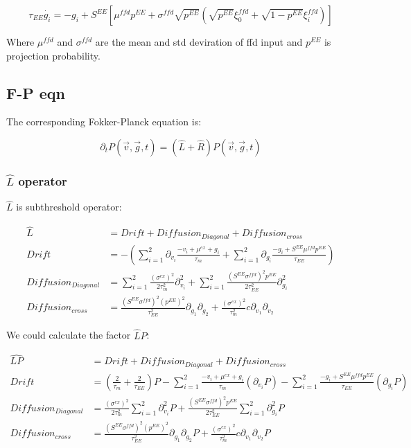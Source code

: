 \documentclass{article}
\begin{document}
\begin{equation}
	\tau_{EE}\dot{g_{i}}=-g_i+S^{EE}[\mu^{ffd}p^{EE}+\sigma^{ffd}\sqrt{p^{EE}}(\sqrt{p^{EE}}\xi^{ffd}_0+\sqrt{1-p^{EE}}\xi^{ffd}_i)]
\end{equation}

Where $\mu^{ffd}$ and $\sigma^{ffd}$ are the mean and std deviration of ffd input and $p^{EE}$ is projection probability.

\subsection{F-P eqn}
The corresponding Fokker-Planck equation is:

\begin{equation}
	\partial_tP(\vec{v},\vec{g},t)=(\hat{L}+\hat{R})P(\vec{v},\vec{g},t)
\end{equation}

\subsubsection{$\hat{L}$ operator}

$\hat{L}$ is subthreshold operator:

\begin{align}
	\hat{L}&=Drift + Diffusion_{Diagonal}+Diffusion_{cross}\\
	Drift&=-(\sum_{i=1}^{2}\partial_{v_i}\frac{-v_i+\mu^{ex}+g_i}{\tau_m}+\sum_{i=1}^{2}\partial_{g_i}\frac{-g_i+S^{EE}\mu^{ffd}p^{EE}}{\tau_{EE}})\\
	Diffusion_{Diagonal}&=\sum_{i=1}^{2}\frac{(\sigma^{ex})^2}{2\tau_m^2}\partial_{v_i}^2+\sum_{i=1}^{2}\frac{(S^{EE}\sigma^{ffd})^2p^{EE}}{2\tau_{EE}^2}\partial_{g_i}^2\\
	Diffusion_{cross}&=\frac{(S^{EE}\sigma^{ffd})^2(p^{EE})^2}{\tau_{EE}^2}\partial_{g_1}\partial_{g_2}+\frac{(\sigma^{ex})^2}{\tau_m^2}c\partial_{v_1}\partial_{v_2}
\end{align}

We could calculate the factor $\hat{L}P$:

\begin{align}
	\hat{LP}&=Drift + Diffusion_{Diagonal}+Diffusion_{cross}\\
	Drift&=(\frac{2}{\tau_m}+\frac{2}{\tau_{EE}})P-\sum_{i=1}^2\frac{-v_i+\mu^{ex}+g_i}{\tau_m}(\partial_{v_i}P)-\sum_{i=1}^2\frac{-g_i+S^{EE}\mu^{ffd}p^{EE}}{\tau_{EE}}(\partial_{g_i}P)\\
	Diffusion_{Diagonal}&=\frac{(\sigma^{ex})^2}{2\tau_m^2}\sum_{i=1}^{2}\partial_{v_i}^2P+\frac{(S^{EE}\sigma^{ffd})^2p^{EE}}{2\tau_{EE}^2}\sum_{i=1}^{2}\partial_{g_i}^2P\\
	Diffusion_{cross}&=\frac{(S^{EE}\sigma^{ffd})^2(p^{EE})^2}{\tau_{EE}^2}\partial_{g_1}\partial_{g_2}P+\frac{(\sigma^{ex})^2}{\tau_m^2}c\partial_{v_1}\partial_{v_2}P
\end{align}
\end{document}
